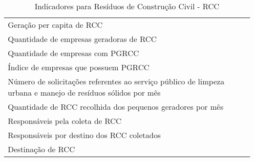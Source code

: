 \begin{table}[h!]
  \centering
  \caption{Indicadores para Resíduos de Construção Civil - RCC}
    \begin{tabular}{|p{31.355em}|}
    \rowcolor[rgb]{ .984,  .831,  .706} \multicolumn{1}{p{31.355em}}{RESÍDUOS DE CONSTRUÇÃO CIVIL} \\
    \midrule
    Geração per capita de RCC \\
    \midrule
    Quantidade de empresas geradoras de RCC \\
    \midrule
    Quantidade de empresas com PGRCC \\
    \midrule
    Índice de empresas que possuem PGRCC \\
    \midrule
    Número de solicitações referentes ao serviço público de limpeza urbana e manejo de resíduos sólidos por mês   \\
    \midrule
    Quantidade de RCC recolhida dos pequenos geradores por mês \\
    \midrule
    Responsáveis pela coleta de RCC \\
    \midrule
    Responsáveis por destino dos RCC coletados \\
    \midrule
    Destinação de RCC \\
    \bottomrule
    \end{tabular}%
  \label{tab:ind_rcc}%
\end{table}%
